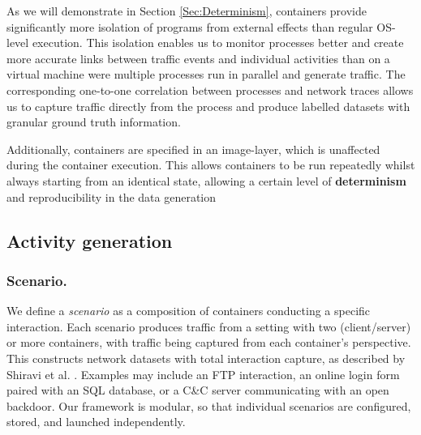 \documentclass[runningheads]{llncs}
\begin{document}
As we will demonstrate in Section \ref{Sec:Determinism}, containers provide significantly more isolation of programs from external effects than regular OS-level execution. This isolation enables us to monitor processes better and create more accurate links between traffic events and individual activities than on a virtual machine were multiple processes run in parallel and generate traffic. The corresponding one-to-one correlation between processes and network traces allows us to capture traffic directly from the process and produce labelled datasets with granular ground truth information.

Additionally, containers are specified in an image-layer, which is unaffected during the container execution. This allows containers to be run repeatedly whilst always starting from an identical state, allowing a certain level of \textbf{determinism} and reproducibility in the data generation  %

 

\subsection{Activity generation}\label{Sec:Scenarios}

\subsubsection*{Scenario.}
We define a \emph{scenario} as a composition of containers conducting a specific interaction. Each scenario produces traffic from a setting with two (client/server) or more containers, with traffic being captured from each container's perspective. This constructs network datasets with total interaction capture, as described by Shiravi et al. \cite{shiravi2012toward}.
Examples may include an FTP interaction, an online login form paired with an SQL database, or a C\&C server communicating with an open backdoor. %
Our framework is modular, so that individual scenarios are configured, stored, and launched independently. %
\end{document}

